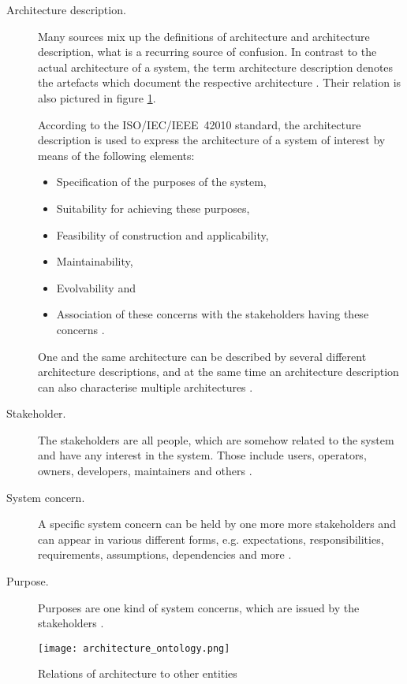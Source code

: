 \begin{description}
\item [Architecture description.]
	Many sources mix up the definitions of architecture and architecture description, what is a recurring source of confusion. In contrast to the actual architecture of a system, the term architecture description denotes the artefacts which document the respective architecture \cite{ISO_42010}. Their relation is also pictured in figure \ref{fig:architecture_ontology}.

	According to the \mbox{ISO/IEC/IEEE 42010} standard, the architecture description is used to express the architecture of a system of interest by means of the following elements:
	\begin{itemize}
	\item Specification of the purposes of the system,
	\item Suitability for achieving these purposes,
	\item Feasibility of construction and applicability,
	\item Maintainability,
	\item Evolvability and
	\item Association of these concerns with the stakeholders having these concerns \cite{ISO_42010}.
	\end{itemize}
	One and the same architecture can be described by several different architecture descriptions, and at the same time an architecture description can also characterise multiple architectures \cite{ISO_42010}.

\item [Stakeholder.]
	The stakeholders are all people, which are somehow related to the system and have any interest in the system. Those include users, operators, owners, developers, maintainers and others \cite{ISO_42010}.

\item [System concern.]
	A specific system concern can be held by one more more stakeholders and can appear in various different forms, e.g. expectations, responsibilities, requirements, assumptions, dependencies and more \cite{ISO_42010}. 

\item [Purpose.]
	Purposes are one kind of system concerns, which are issued by the stakeholders \cite{ISO_42010}.
\end{description}

\begin{figure}[!htbp]
\centering
\texttt{[image: architecture\_ontology.png]}
\caption{Relations of architecture to other entities \cite{ISO_42010}}
\label{fig:architecture_ontology}
\end{figure}










